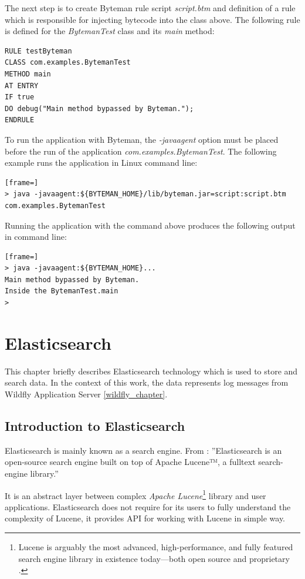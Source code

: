 \documentclass[12pt,oneside]{fithesis2}
\begin{document}
The next step is to create Byteman rule script \textit{script.btm} and definition of a rule which is responsible for injecting bytecode into the class above. The following rule is defined for the \textit{BytemanTest} class and its \textit{main} method:
\begin{lstlisting}[caption = Example of Byteman rule, label = rule_use_case]
RULE testByteman
CLASS com.examples.BytemanTest
METHOD main
AT ENTRY
IF true
DO debug("Main method bypassed by Byteman.");
ENDRULE
\end{lstlisting}
To run the application with Byteman, the \textit{-javaagent} option must be placed before the run of the application \textit{com.examples.BytemanTest}. The following example runs the application in Linux command line:
\begin{lstlisting}[frame=]
> java -javaagent:${BYTEMAN_HOME}/lib/byteman.jar=script:script.btm com.examples.BytemanTest
\end{lstlisting}

Running the application with the command above produces the following output in command line:
\begin{lstlisting}[frame=]
> java -javaagent:${BYTEMAN_HOME}...
Main method bypassed by Byteman.
Inside the BytemanTest.main
>
\end{lstlisting}

\chapter{Elasticsearch}
\label{elasticsearch_chap}
This chapter briefly describes Elasticsearch technology which is used to store and search data. In the context of this work, the data represents log messages from Wildfly Application Server \ref{wildfly_chapter}.

\section{Introduction to Elasticsearch}
Elasticsearch is mainly known as a search engine. From \cite{elasticsearch_defnitive_guide}: ''Elasticsearch is an open-source search engine built on top of Apache Lucene™, a fulltext search-engine library.''

It is an abstract layer between complex \textit{Apache Lucene}\footnote{Lucene is arguably the most advanced, high-performance, and fully featured search engine library in existence today—both open source and proprietary \cite{elasticsearch_defnitive_guide}.} library and user applications. Elasticsearch does not require for its users to fully understand the complexity of Lucene, it provides API for working with Lucene in simple way.
\end{document}
